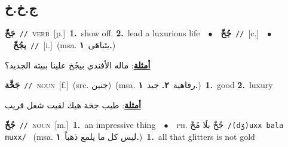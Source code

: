 \documentclass[10pt,a4paper,twoside]{article} %
\begin{document}
\begin{multicols}{2}
\vspace{-3mm}
\subsection*{\color{blue}\foreignlanguage{arabic}{ج.خ.خ}\color{blue}{}} 

{\setlength\topsep{0pt}\textbf{\foreignlanguage{arabic}{جَخّ}}\ {\color{gray}\texttt{//}\color{black}}\ \textsc{verb}\ [p.]\ \textbf{1.}~show off.  \textbf{2.}~lead a luxurious life\ \ $\bullet$\ \ \setlength\topsep{0pt}\textbf{\foreignlanguage{arabic}{جُخّ}}\ {\color{gray}\texttt{//}\color{black}}\ [c.]\ \ $\bullet$\ \ \setlength\topsep{0pt}\textbf{\foreignlanguage{arabic}{يجُخّ}}\ {\color{gray}\texttt{//}\color{black}}\ [i.]\ \color{gray}(msa. \foreignlanguage{arabic}{يتَباهَى}~\foreignlanguage{arabic}{\textbf{١.}})\color{black}\  \begin{flushright}\color{gray}\foreignlanguage{arabic}{\textbf{\underline{\foreignlanguage{arabic}{أمثلة}}}: ماله الأفندي بيجُخ علينا ببيته الجديد؟}\end{flushright}\color{black}} \vspace{2mm}

{\setlength\topsep{0pt}\textbf{\foreignlanguage{arabic}{جَخَّة}}\ {\color{gray}\texttt{//}\color{black}}\ \textsc{noun}\ [f.]\ (src. \color{gray}\foreignlanguage{arabic}{جنين}\color{black})\ \color{gray}(msa. \foreignlanguage{arabic}{رفاهية}~\foreignlanguage{arabic}{\textbf{٢.}}  \foreignlanguage{arabic}{جيد}~\foreignlanguage{arabic}{\textbf{١.}})\color{black}\ \textbf{1.}~good  \textbf{2.}~luxury\  \begin{flushright}\color{gray}\foreignlanguage{arabic}{\textbf{\underline{\foreignlanguage{arabic}{أمثلة}}}: طيب جخة هيك لقيت شغل قريب}\end{flushright}\color{black}} \vspace{2mm}

{\setlength\topsep{0pt}\textbf{\foreignlanguage{arabic}{جُخّ}}\ {\color{gray}\texttt{//}\color{black}}\ \textsc{noun}\ [m.]\ \textbf{1.}~an impressive thing\ \ $\bullet$\ \ \textsc{ph.} \color{gray} \foreignlanguage{arabic}{جُخّ بلَا مُخّ}\color{black}\ {\color{gray}\texttt{/{\sffamily (dʒ)uxx bala muxx}/}\color{black}}\ \color{gray} (msa. \foreignlanguage{arabic}{ليس كل ما يلمع ذهباً}~\foreignlanguage{arabic}{\textbf{١.}})\color{black}\ \textbf{1.}~all that glitters is not gold\ } \vspace{2mm}


\end{multicols}
\end{document}
